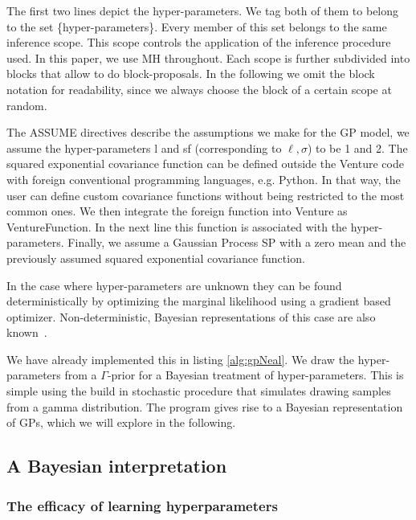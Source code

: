 \documentclass{article} %
\begin{document}
The first two lines depict the hyper-parameters. We tag both of them to belong to the set \{hyper-parameters\}. Every member of this set belongs to the same inference scope. This scope controls the application of the inference procedure used. In this paper, we use MH throughout. Each scope is further subdivided into blocks that allow to do block-proposals. In the following we omit the block notation for readability, since we always choose the block of a certain scope at random.

The ASSUME directives describe the assumptions we make for the GP model, we assume the hyper-parameters l and sf (corresponding to $\ell,\sigma$) to be 1 and 2. The squared exponential covariance function can be defined outside the Venture code with foreign conventional programming languages, e.g. Python. In that way, the user can define custom covariance functions without being restricted to the most common ones. We then integrate the foreign function into Venture as VentureFunction. In the next line this function is associated with the hyper-parameters. Finally, we assume a Gaussian Process SP with a zero mean and the previously assumed squared exponential covariance function.





In the case where hyper-parameters are unknown they can be found deterministically by optimizing the marginal likelihood using a gradient based optimizer. Non-deterministic, Bayesian representations of this case are also known~\citep{neal1997monte}. 

We have already implemented this in listing \ref{alg:gpNeal}. We draw the hyper-parameters from a $\Gamma$-prior for a Bayesian treatment of hyper-parameters. This is simple using the build in stochastic procedure that simulates drawing samples from a gamma distribution.
The program gives rise to a Bayesian representation of GPs, which we will explore in the following.

\subsection{A Bayesian interpretation}


\subsubsection{The efficacy of learning hyperparameters}
\end{document}
